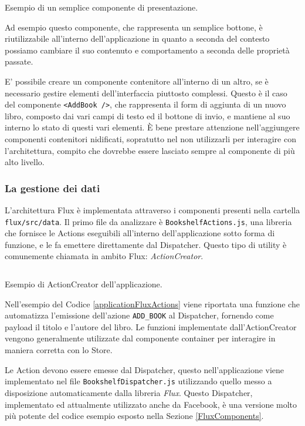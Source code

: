 \begin{listing}[ht]
\inputminted{jsx}{sources/applicationFluxButton.js}
\caption{Esempio di un semplice componente di presentazione.} 
\label{applicationFluxButton} 
\end{listing} 

Ad esempio questo componente, che rappresenta un semplice bottone, è riutilizzabile all'interno dell'applicazione in quanto a seconda del contesto possiamo cambiare il suo contenuto e comportamento a seconda delle proprietà passate.

E' possibile creare un componente contenitore all'interno di un altro, se è necessario gestire elementi dell'interfaccia piuttosto complessi. Questo è il caso del componente \texttt{<AddBook />}, che rappresenta il form di aggiunta di un nuovo libro, composto dai vari campi di testo ed il bottone di invio, e mantiene al suo interno lo stato di questi vari elementi. È bene prestare attenzione nell'aggiungere componenti contenitori nidificati, sopratutto nel non utilizzarli per interagire con l'architettura, compito che dovrebbe essere lasciato sempre al componente di più alto livello.

\subsubsection*{La gestione dei dati}
L'architettura Flux è implementata attraverso i componenti presenti nella cartella \texttt{flux/src/data}. Il primo file da analizzare è \texttt{BookshelfActions.js}, una libreria che fornisce le Actions eseguibili all'interno dell'applicazione sotto forma di funzione, e le fa emettere direttamente dal Dispatcher. Questo tipo di utility è comunemente chiamata in ambito Flux: \textit{ActionCreator}.

\begin{listing}[ht]
\inputminted{jsx}{sources/applicationFluxActions.js}
\caption{Esempio di ActionCreator dell'applicazione.} 
\label{applicationFluxActions} 
\end{listing} 

Nell'esempio del Codice \ref{applicationFluxActions} viene riportata una funzione che automatizza l'emissione dell'azione \texttt{ADD_BOOK} al Dispatcher, fornendo come payload il titolo e l'autore del libro.
Le funzioni implementate dall'ActionCreator vengono generalmente utilizzate dal componente container per interagire in maniera corretta con lo Store.

Le Action devono essere emesse dal Dispatcher, questo nell'applicazione viene implementato nel file \texttt{BookshelfDispatcher.js} utilizzando quello messo a disposizione automaticamente dalla libreria \textit{Flux}. Questo Dispatcher, implementato ed attualmente utilizzato anche da Facebook, è una versione molto più potente del codice esempio esposto nella Sezione \ref{FluxComponents}.

